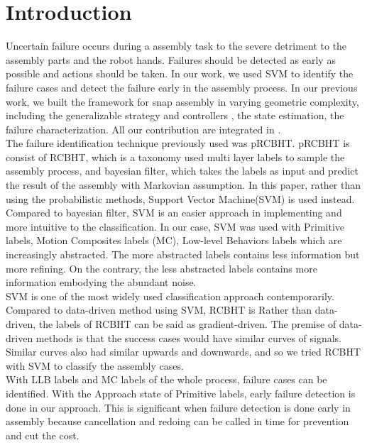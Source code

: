 
\chapter{Introduction}

Uncertain failure occurs during a assembly task to the severe detriment to the assembly parts and the robot hands. Failures should be detected as early as possible and actions should be taken. In our work, we used SVM to identify the failure cases and detect the failure early in the assembly process.
\indent In our previous work, we built the framework for snap assembly in varying geometric complexity, including the generalizable strategy and controllers\cite{2012JAR-Rojas-AutHetBotAsmbly} \cite{2012ICMA-Rojas-PivotApproach}, the state estimation\cite{2012IROS-Rojas-RCBHT}, the failure characterization\cite{2012Humanoids-Rojas-pRCBHT}. All our contribution are integrated in \cite{2013IJMA-Rojas-TwrdsSnapSensing}. \\
\indent The failure identification technique previously used was pRCBHT\cite{2013IJMA-Rojas-TwrdsSnapSensing}. pRCBHT is consist of RCBHT, which is a taxonomy used multi layer labels to sample the assembly process, and bayesian filter, which takes the labels as input and predict the result of the assembly with Markovian assumption. In this paper, rather than using the probabilistic methods, Support Vector Machine(SVM) is used instead. Compared to bayesian filter, SVM is an easier approach in implementing and more intuitive to the classification. In our case, SVM was used with Primitive labels, Motion Composites labels (MC), Low-level Behaviors labels which are increasingly abstracted. The more abstracted labels contains less information but more refining. On the contrary, the less abstracted labels contains more information embodying the abundant noise. \\
\indent SVM is one of the most widely used classification approach contemporarily. Compared to data-driven method using SVM\cite{masonfailure}, RCBHT is Rather than data-driven, the labels of RCBHT can be said as gradient-driven. The premise of data-driven methods is that the success cases would have similar curves of signals. Similar curves also had similar upwards and downwards, and so we tried RCBHT with SVM to classify the assembly cases. \\
\indent With LLB labels and MC labels of the whole process, failure cases can be identified. With the Approach state of Primitive labels, early failure detection is done in our approach. This is significant when failure detection is done early in assembly because cancellation and redoing can be called in time for prevention and cut the cost.\\
